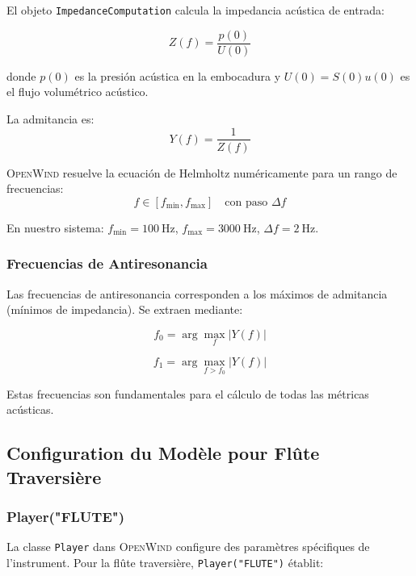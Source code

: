 \documentclass[12pt,a4paper,twocolumn]{article}
\newcommand{\openwind}{\textsc{OpenWind}}
\newcommand{\impedance}{Z}
\newcommand{\admittance}{Y}
\newcommand{\freqzero}{f_0}
\newcommand{\freqone}{f_1}
\begin{document}
El objeto \texttt{ImpedanceComputation} calcula la impedancia acústica de entrada:

\begin{equation}
\impedance(f) = \frac{p(0)}{U(0)}
\end{equation}

donde $p(0)$ es la presión acústica en la embocadura y $U(0) = S(0) u(0)$ es el flujo volumétrico acústico.

La admitancia es:
\begin{equation}
\admittance(f) = \frac{1}{\impedance(f)}
\end{equation}

\openwind{} resuelve la ecuación de Helmholtz numéricamente para un rango de frecuencias:
\begin{equation}
f \in [f_{\min}, f_{\max}] \quad \text{con paso } \Delta f
\end{equation}

En nuestro sistema: $f_{\min} = \SI{100}{\hertz}$, $f_{\max} = \SI{3000}{\hertz}$, $\Delta f = \SI{2}{\hertz}$.

\subsubsection{Frecuencias de Antiresonancia}

Las frecuencias de antiresonancia corresponden a los máximos de admitancia (mínimos de impedancia). Se extraen mediante:

\begin{equation}
\freqzero = \arg\max_f |\admittance(f)|
\end{equation}

\begin{equation}
\freqone = \arg\max_{f > \freqzero} |\admittance(f)|
\end{equation}

Estas frecuencias son fundamentales para el cálculo de todas las métricas acústicas.

\subsection{Configuration du Modèle pour Flûte Traversière}

\subsubsection{Player("FLUTE")}

La classe \texttt{Player} dans \openwind{} configure des paramètres spécifiques de l'instrument. Pour la flûte traversière, \texttt{Player("FLUTE")} établit:
\end{document}
